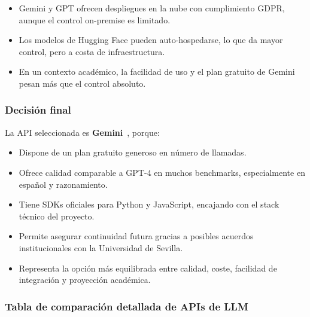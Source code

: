 \begin{itemize}
    \item Gemini y GPT ofrecen despliegues en la nube con cumplimiento GDPR, aunque el control on-premise es limitado.
    \item Los modelos de Hugging Face pueden auto-hospedarse, lo que da mayor control, pero a costa de infraestructura.
    \item En un contexto académico, la facilidad de uso y el plan gratuito de Gemini pesan más que el control absoluto.
\end{itemize}

\subsubsection{Decisión final}

La API seleccionada es \textbf{Gemini}~\cite{geminidocs}, porque:

\begin{itemize}
    \item Dispone de un plan gratuito generoso en número de llamadas.
    \item Ofrece calidad comparable a GPT-4 en muchos benchmarks, especialmente en español y razonamiento.
    \item Tiene SDKs oficiales para Python y JavaScript, encajando con el stack técnico del proyecto.
    \item Permite asegurar continuidad futura gracias a posibles acuerdos institucionales con la Universidad de Sevilla.
    \item Representa la opción más equilibrada entre calidad, coste, facilidad de integración y proyección académica.
\end{itemize}

\subsubsection{Tabla de comparación detallada de APIs de LLM}


